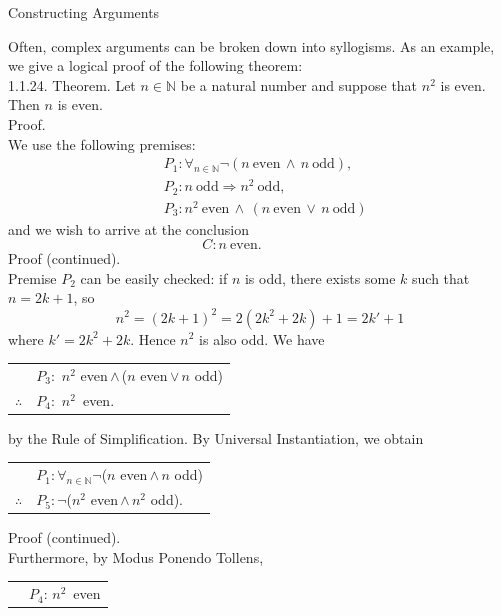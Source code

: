 \documentclass[smaller,hyperref={CJKbookmarks=true}]{beamer}
\newcommand{\N}{\mathbb{N}} \newcommand{\Z}{\mathbb{Z}} \newcommand{\Q}{\mathbb{Q}}
\begin{document}
\begin{frame}{Constructing Arguments}
\begin{spacing}{1.05}
Often, complex arguments can be broken down into syllogisms. As an
example, we give a logical proof of the following theorem:\\[5pt]
\alert{1.1.24. Theorem.} Let $n\in\N$ be a natural number and suppose that $n^2$ is even. Then $n$ is even.\\[5pt]
\alert{Proof.}\\
We use the following premises:
\begin{align*}
   &P_1\!:\mathop{\forall}_{n\in\N}\neg(n~
   \text{even}\,\wedge\,n~\text{odd}),  \\
   &P_2\!:n~\text{odd}\Rightarrow n^2~\text{odd},  \\
   &P_3\!:n^2~\text{even}\,\wedge\,(n~
   \text{even}\,\vee\,n~\text{odd})
\end{align*}
and we wish to arrive at the conclusion
\[C\!:n~\text{even}.\qquad\qquad\]
\newpage
\alert{Proof (continued).}\\[3pt]
Premise $P_2$ can be easily checked: if $n$ is odd, there exists some $k$ such that $n=2k+1$, so
\[n^2=(2k+1)^2=2(2k^2+2k)+1=2k'+1\]
where $k'=2k^2+2k$. Hence $n^2$ is also odd. We have
\begin{center}
  \begin{tabular}{cl}
    & $P_3$:~$n^2$ even\,$\wedge$\,($n$ even\,$\vee$\,$n$ odd) \\
     \cmidrule{2-2}
   $\therefore$ & $P_4$:~$n^2$~even. \\
 \end{tabular}
\end{center}
by the Rule of Simplification. By Universal Instantiation, we obtain
\begin{center}
  \begin{tabular}{cl}
    & $\displaystyle P_1\!:\mathop{\forall}_{n\in\N}\neg$($n$ even\,$\wedge$\,$n$ odd) \\
     \cmidrule{2-2}
   $\therefore$ & $P_5\!:\neg$($n^2$ even\,$\wedge$\,$n^2$ odd). \\
 \end{tabular}
\end{center}
\newpage
\alert{Proof (continued).}\\
Furthermore, by Modus Ponendo Tollens,
\begin{center}
  \begin{tabular}{cl}
    & $P_4\!:\,n^2$~even \\

\end{tabular}
\end{center}
\end{spacing}
\end{frame}
\end{document}
